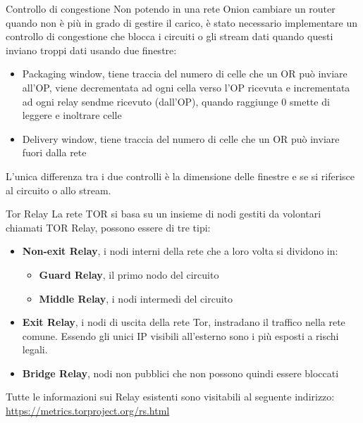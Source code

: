 \begin{frame}{Controllo di congestione}
    Non potendo in una rete Onion cambiare un router quando non è più in grado di gestire il carico, è stato necessario implementare un controllo di congestione che blocca i circuiti o gli stream dati quando questi inviano troppi dati usando due finestre:
    \begin{itemize}
        \item Packaging window, tiene traccia del numero di celle che un OR può inviare all'OP,     viene decrementata ad ogni cella verso l'OP ricevuta e incrementata ad ogni relay sendme ricevuto (dall'OP), quando raggiunge 0 smette di leggere e inoltrare celle
        \item Delivery window, tiene traccia del numero di celle che un OR può inviare fuori dalla rete
    \end{itemize}
    L'unica differenza tra i due controlli è la dimensione delle finestre e se si riferisce al circuito o allo stream.
\end{frame}

\begin{frame}{Tor Relay}
    La rete TOR si basa su un insieme di nodi gestiti da volontari chiamati TOR Relay, possono essere di tre tipi:
    \begin{itemize}
        \item \textbf{Non-exit Relay}, i nodi interni della rete che a loro volta si dividono in:
        \begin{itemize}
            \item \textbf{Guard Relay}, il primo nodo del circuito
            \item \textbf{Middle Relay}, i nodi intermedi del circuito
        \end{itemize}
        \item \textbf{Exit Relay}, i nodi di uscita della rete Tor, instradano il traffico nella rete comune. Essendo gli unici IP visibili all'esterno sono i più esposti a rischi legali.
        \item \textbf{Bridge Relay}, nodi non pubblici che non possono quindi essere bloccati
    \end{itemize}
    Tutte le informazioni sui Relay esistenti sono visitabili al seguente indirizzo: \url{https://metrics.torproject.org/rs.html}

\end{frame}

